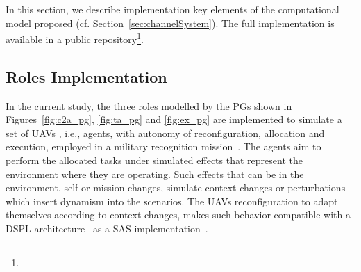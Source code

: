 In this section, we describe implementation key elements of the computational model proposed (cf. Section~\ref{sec:channelSystem}). The full implementation is available in a public repository\footnote{\gitRepository}.


\subsection{Roles Implementation}


 
In the current study, the three roles modelled by the PGs shown in Figures~\ref{fig:c2a_pg}, \ref{fig:ta_pg} and \ref{fig:ex_pg} are implemented to simulate a set of UAVs , i.e., agents, with autonomy of reconfiguration, allocation and execution, employed in a military recognition mission~\cite{UAV_Aplication}. The agents aim to perform the allocated tasks under simulated effects that represent the environment where they are operating. Such effects that can be in the environment, self or mission changes, simulate context changes or perturbations which insert dynamism into the scenarios. The UAVs reconfiguration to adapt themselves according to context changes, makes such behavior compatible with a DSPL architecture~\cite{c2-02} as a SAS implementation~\citep{BencomoHA12}.

